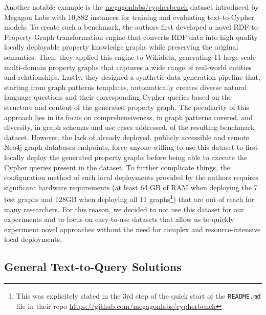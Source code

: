 Another notable example is the \href{https://huggingface.co/datasets/megagonlabs/cypherbench}{megagonlabs/cypherbench} dataset introduced by Megagon Labs \cite{cypherbench-megagonlabs-2024} with 10,882 instances for training and evaluating text-to-Cypher models. To create such a benchmark, the authors first developed a novel RDF-to-Property-Graph transformation engine that converts RDF data into high quality locally deployable property knowledge graphs while preserving the original semantics. Then, they applied this engine to Wikidata, generating 11 large-scale multi-domain property graphs that captures a wide range of real-world entities and relationships. Lastly, they designed a synthetic data generation pipeline that, starting from graph patterns templates, automatically creates diverse natural language questions and their corresponding Cypher queries based on the structure and content of the generated property graph. The peculiarity of this approach lies in its focus on comprehensiveness, in graph patterns covered, and diversity, in graph schemas and use cases addressed, of the resulting benchmark dataset. However, the lack of already deployed, publicly accessible and remote Neo4j graph databases endpoints, force anyone willing to use this dataset to first locally deploy the generated property graphs before being able to execute the Cypher queries present in the dataset. To further complicate things, the configuration method of such local deployments provided by the authors requires significant hardware requirements (at least 64 GB of RAM when deploying the 7 test graphs and 128GB when deploying all 11 graphs\footnote{This was explicitely stated in the 3rd step of the quick start of the \texttt{README.md} file in their repo \url{https://github.com/megagonlabs/cypherbench}}) that are out of reach for many researchers. For this reason, we decided to not use this dataset for our experiments and to focus on easy-to-use datasets that allow us to quickly experiment novel approaches without the need for complex and resource-intensive local deployments.

\subsection{General Text-to-Query Solutions}
\label{sec:text-to-query-solutions}

